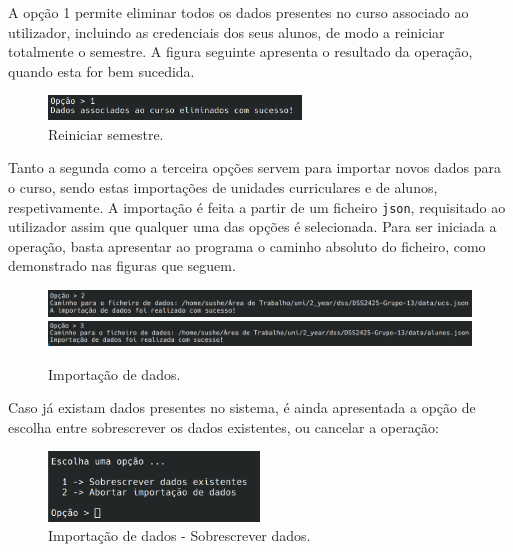 \documentclass[12pt, a4paper]{article}
\begin{document}
A opção 1 permite eliminar todos os dados presentes no curso associado ao utilizador, incluindo as
credenciais dos seus alunos, de modo a reiniciar totalmente o semestre. A figura seguinte apresenta
o resultado da operação, quando esta for bem sucedida.

\begin{figure}[H]
    \centering
    \includegraphics[width=0.6\textwidth]{Imagens/Manual/DiretorCurso-1.png}
    \caption{Reiniciar semestre.}
\end{figure}

Tanto a segunda como a terceira opções servem para importar novos dados para o curso, sendo estas
importações de unidades curriculares e de alunos, respetivamente. A importação é feita a partir de
um ficheiro \texttt{json}, requisitado ao utilizador assim que qualquer uma das opções é
selecionada. Para ser iniciada a operação, basta apresentar ao programa o caminho absoluto do
ficheiro, como demonstrado nas figuras que seguem.

\begin{figure}[H]
    \centering
    \includegraphics[width=1\textwidth]{Imagens/Manual/DiretorCurso-2.png}
    \includegraphics[width=1\textwidth]{Imagens/Manual/DiretorCurso-3.png}
    \caption{Importação de dados.}
\end{figure}

Caso já existam dados presentes no sistema, é ainda apresentada a opção de escolha entre
sobrescrever os dados existentes, ou cancelar a operação:

\begin{figure}[H]
    \centering
    \includegraphics[width=0.5\textwidth]{Imagens/Manual/DiretorCurso-SobrescreverDados.png}
    \caption{Importação de dados - Sobrescrever dados.}
\end{figure}
\end{document}
